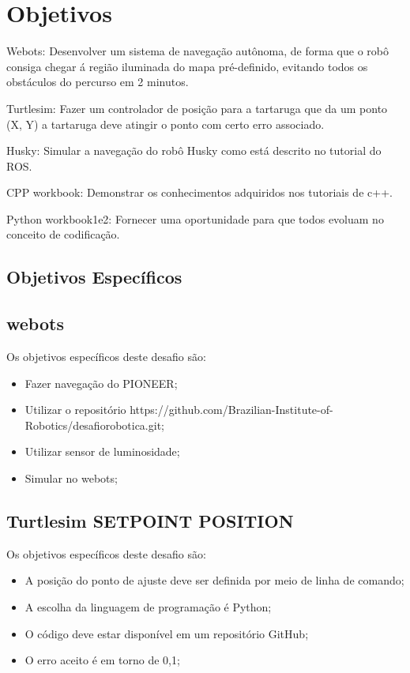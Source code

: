 \section{Objetivos}
\label{sec:obj}
      \item Webots:
Desenvolver um sistema de navegação autônoma, de forma que o robô consiga chegar 
á região iluminada do mapa pré-definido, evitando todos os obstáculos do percurso em 2 minutos.
      \item Turtlesim:
Fazer um controlador de posição para a tartaruga que da um ponto (X, Y) a tartaruga 
deve atingir o ponto com certo erro associado.
      \item Husky:
Simular a navegação do robô Husky como está descrito no tutorial do ROS.
      \item CPP workbook:
Demonstrar os conhecimentos adquiridos nos tutoriais de c++.
      \item Python workbook1e2:
Fornecer uma oportunidade para que todos evoluam no conceito de codificação.
\subsection{Objetivos Específicos}
\label{ssec:objesp}
\subsection{webots}
Os objetivos específicos deste desafio são:
\begin{itemize}
      \item Fazer navegação do PIONEER;
      \item Utilizar o repositório https://github.com/Brazilian-Institute-of-Robotics/desafiorobotica.git;
      \item Utilizar sensor de luminosidade;
      \item Simular no webots;
  \end{itemize}
\subsection{Turtlesim SETPOINT POSITION}
Os objetivos específicos deste desafio são:
\begin{itemize}
      \item A posição do ponto de ajuste deve ser definida por meio de linha de comando;
      \item A escolha da linguagem de programação é Python;
      \item O código deve estar disponível em um repositório GitHub;
      \item O erro aceito é em torno de 0,1;
  \end{itemize}
